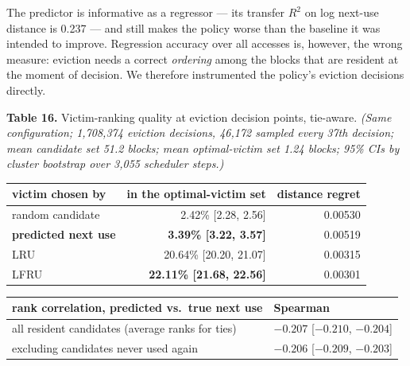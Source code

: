 \documentclass[
  10pt,
  letterpaper,
  10pt]{article}
\newcounter{none} %
\begin{document}
The predictor is informative as a regressor --- its transfer \(R^2\) on
log next-use distance is 0.237 --- and still makes the policy worse than
the baseline it was intended to improve. Regression accuracy over all
accesses is, however, the wrong measure: eviction needs a correct
\emph{ordering} among the blocks that are resident at the moment of
decision. We therefore instrumented the policy's eviction decisions
directly.

\textbf{Table 16.} Victim-ranking quality at eviction decision points,
tie-aware. \emph{(Same configuration; 1,708,374 eviction decisions,
46,172 sampled every 37th decision; mean candidate set 51.2 blocks; mean
optimal-victim set 1.24 blocks; 95\% CIs by cluster bootstrap over 3,055
scheduler steps.)}

{\def\LTcaptype{none} %
\begin{longtable}[]{@{}lrr@{}}
\toprule\noalign{}
victim chosen by & in the optimal-victim set & distance regret \\
\midrule\noalign{}
\endhead
\bottomrule\noalign{}
\endlastfoot
random candidate & 2.42\% {[}2.28, 2.56{]} & 0.00530 \\
\textbf{predicted next use} & \textbf{3.39\% {[}3.22, 3.57{]}} &
0.00519 \\
LRU & 20.64\% {[}20.20, 21.07{]} & 0.00315 \\
LFRU & \textbf{22.11\% {[}21.68, 22.56{]}} & 0.00301 \\
\end{longtable}
}

{\def\LTcaptype{none} %
\begin{longtable}[]{@{}
  >{\raggedright\arraybackslash}p{}
  >{\raggedleft\arraybackslash}p{}@{}}
\toprule\noalign{}
\begin{minipage}[b]{\linewidth}\raggedright
rank correlation, predicted vs.~true next use
\end{minipage} & \begin{minipage}[b]{\linewidth}\raggedleft
Spearman
\end{minipage} \\
\midrule\noalign{}
\endhead
\bottomrule\noalign{}
\endlastfoot
all resident candidates (average ranks for ties) & \(-0.207\)
{[}\(-0.210\), \(-0.204\){]} \\
excluding candidates never used again & \(-0.206\) {[}\(-0.209\),
\(-0.203\){]} \\
\end{longtable}
}
\end{document}
